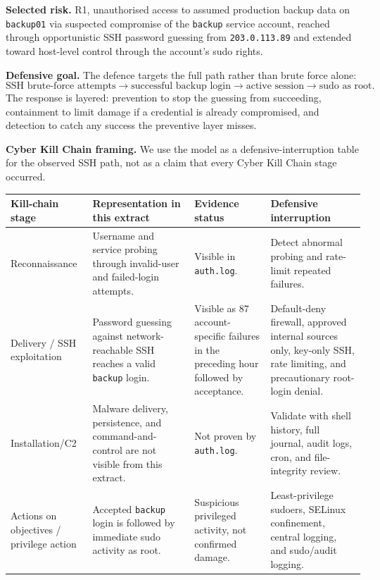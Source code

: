 
\clearpage
{}
\textbf{Selected risk.} R1, unauthorised access to assumed production backup data on \texttt{backup01} via suspected compromise of the \texttt{backup} service account, reached through opportunistic SSH password guessing from \texttt{203.0.113.89} and extended toward host-level control through the account's sudo rights.

\textbf{Defensive goal.} The defence targets the full path rather than brute force alone:
\[
\text{SSH brute-force attempts} \rightarrow \text{successful backup login} \rightarrow \text{active session} \rightarrow \text{sudo as root}.
\]
The response is layered: prevention to stop the guessing from succeeding, containment to limit damage if a credential is already compromised, and detection to catch any success the preventive layer misses.

\textbf{Cyber Kill Chain framing.} We use the model as a defensive-interruption table for the observed SSH path, not as a claim that every Cyber Kill Chain stage occurred.

\begin{center}
\scriptsize
\begin{tabularx}{\linewidth}{L{2.2cm}Y L{2.2cm}L{3.35cm}}
\toprule
Kill-chain stage & Representation in this extract & Evidence status & Defensive interruption \\
\midrule
Reconnaissance & Username and service probing through invalid-user and failed-login attempts. & Visible in \texttt{auth.log}. & Detect abnormal probing and rate-limit repeated failures. \\
Delivery / SSH exploitation & Password guessing against network-reachable SSH reaches a valid \texttt{backup} login. & Visible as 87 account-specific failures in the preceding hour followed by acceptance. & Default-deny firewall, approved internal sources only, key-only SSH, rate limiting, and precautionary root-login denial. \\
Installation/C2 & Malware delivery, persistence, and command-and-control are not visible from this extract. & Not proven by \texttt{auth.log}. & Validate with shell history, full journal, audit logs, cron, and file-integrity review. \\
Actions on objectives / privilege action & Accepted \texttt{backup} login is followed by immediate sudo activity as root. & Suspicious privileged activity, not confirmed damage. & Least-privilege sudoers, SELinux confinement, central logging, and sudo/audit logging. \\
\bottomrule
\end{tabularx}
\end{center}

